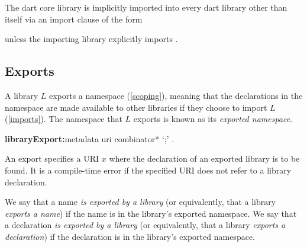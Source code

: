 \documentclass{article}
\begin{document}

\LMHash{}
The dart core library  is implicitly imported into every dart library other than itself via an import clause of the form


unless the importing library explicitly imports .




\subsection{Exports}

\LMHash{}
A library $L$ exports a namespace (\ref{scoping}), meaning that the declarations in the namespace are made available to other libraries if they choose to import $L$ (\ref{imports}).
The namespace that $L$ exports is known as its {\em exported namespace}.

\begin{grammar}
{\bf libraryExport:}metadata \EXPORT{} uri combinator* `{\escapegrammar ;}'
  .
\end{grammar}

\LMHash{}
An export specifies a URI $x$ where the declaration of an exported library is to be found.
It is a compile-time error if the specified URI does not refer to a library declaration.

\LMHash{}
We say that a name {\em is exported by a library} (or equivalently, that a library {\em exports a name}) if the name is in the library's exported namespace.
We say that a declaration {\em is exported by a library} (or equivalently, that a library {\em exports a declaration}) if the declaration is in the library's exported namespace.
\end{document}
